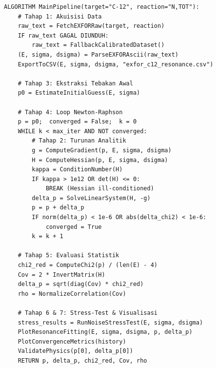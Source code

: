 \begin{lstlisting}[caption={Pseudocode alur kerja utama pipeline komputasi fitting Breit-Wigner.}]
ALGORITHM MainPipeline(target="C-12", reaction="N,TOT"):
    # Tahap 1: Akuisisi Data
    raw_text = FetchEXFORRaw(target, reaction)
    IF raw_text GAGAL DIUNDUH:
        raw_text = FallbackCalibratedDataset()
    (E, sigma, dsigma) = ParseEXFORAscii(raw_text)
    ExportToCSV(E, sigma, dsigma, "exfor_c12_resonance.csv")

    # Tahap 3: Ekstraksi Tebakan Awal
    p0 = EstimateInitialGuess(E, sigma)

    # Tahap 4: Loop Newton-Raphson
    p = p0;  converged = False;  k = 0
    WHILE k < max_iter AND NOT converged:
        # Tahap 2: Turunan Analitik
        g = ComputeGradient(p, E, sigma, dsigma)
        H = ComputeHessian(p, E, sigma, dsigma)
        kappa = ConditionNumber(H)
        IF kappa > 1e12 OR det(H) <= 0:
            BREAK (Hessian ill-conditioned)
        delta_p = SolveLinearSystem(H, -g)
        p = p + delta_p
        IF norm(delta_p) < 1e-6 OR abs(delta_chi2) < 1e-6:
            converged = True
        k = k + 1

    # Tahap 5: Evaluasi Statistik
    chi2_red = ComputeChi2(p) / (len(E) - 4)
    Cov = 2 * InvertMatrix(H)
    delta_p = sqrt(diag(Cov) * chi2_red)
    rho = NormalizeCorrelation(Cov)

    # Tahap 6 & 7: Stress-Test & Visualisasi
    stress_results = RunNoiseStressTest(E, sigma, dsigma)
    PlotResonanceFitting(E, sigma, dsigma, p, delta_p)
    PlotConvergenceMetrics(history)
    ValidatePhysics(p[0], delta_p[0])
    RETURN p, delta_p, chi2_red, Cov, rho
\end{lstlisting}
